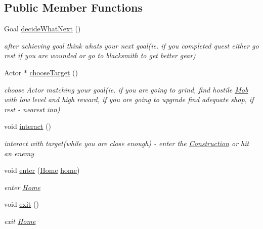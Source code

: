 \subsection*{Public Member Functions}
\begin{DoxyCompactItemize}
\item 
Goal \hyperlink{class_mob_ac949a1e6a9a60efd432adea5a4abdeb8}{decide\+What\+Next} ()\hypertarget{class_mob_ac949a1e6a9a60efd432adea5a4abdeb8}{}\label{class_mob_ac949a1e6a9a60efd432adea5a4abdeb8}

\begin{DoxyCompactList}\small\item\em after achieving goal think what\textquotesingle{}s your next goal(ie. if you completed quest either go rest if you are wounded or go to blacksmith to get better gear) \end{DoxyCompactList}\item 
Actor $\ast$ \hyperlink{class_mob_a80987418449007527dea30234099c301}{choose\+Target} ()\hypertarget{class_mob_a80987418449007527dea30234099c301}{}\label{class_mob_a80987418449007527dea30234099c301}

\begin{DoxyCompactList}\small\item\em choose Actor matching your goal(ie. if you are going to grind, find hostile \hyperlink{class_mob}{Mob} with low level and high reward, if you are going to upgrade find adequate shop, if rest -\/ nearest inn) \end{DoxyCompactList}\item 
void \hyperlink{class_mob_af89dfe24c4bea6d4fea6affd0b752c04}{interact} ()\hypertarget{class_mob_af89dfe24c4bea6d4fea6affd0b752c04}{}\label{class_mob_af89dfe24c4bea6d4fea6affd0b752c04}

\begin{DoxyCompactList}\small\item\em interact with target(while you are close enough) -\/ enter the \hyperlink{class_construction}{Construction} or hit an enemy \end{DoxyCompactList}\item 
void \hyperlink{class_mob_a014041e72f2c65a2eabe313e3f175de0}{enter} (\hyperlink{class_home}{Home} \hyperlink{class_mob_ad3824bdc42d4041e184201c7801ab35e}{home})\hypertarget{class_mob_a014041e72f2c65a2eabe313e3f175de0}{}\label{class_mob_a014041e72f2c65a2eabe313e3f175de0}

\begin{DoxyCompactList}\small\item\em enter \hyperlink{class_home}{Home} \end{DoxyCompactList}\item 
void \hyperlink{class_mob_aeac9e7dd6c5da44ad88f3458019c66ab}{exit} ()\hypertarget{class_mob_aeac9e7dd6c5da44ad88f3458019c66ab}{}\label{class_mob_aeac9e7dd6c5da44ad88f3458019c66ab}

\begin{DoxyCompactList}\small\item\em exit \hyperlink{class_home}{Home} \end{DoxyCompactList}\end{DoxyCompactItemize}
